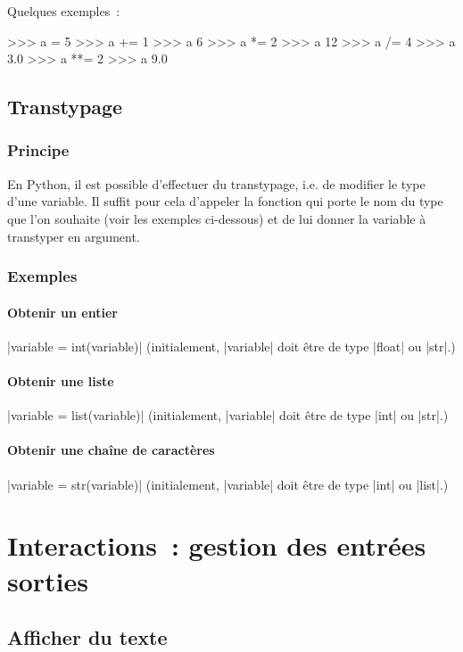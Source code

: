 		Quelques exemples~:
		
		\begin{pythoncode}
			>>> a = 5
			>>> a += 1
			>>> a
			6
			>>> a *= 2
			>>> a
			12
			>>> a /= 4
			>>> a
			3.0
			>>> a **= 2
			>>> a
			9.0
		\end{pythoncode}
	
	\subsection{Transtypage}
		
		\subsubsection{Principe}
		En Python, il est possible d'effectuer du transtypage, i.e. de modifier le type d'une variable. Il suffit pour cela d'appeler la fonction qui porte le nom du type que l'on souhaite (voir les exemples ci-dessous) et de lui donner la variable à transtyper en argument.
		
		\subsubsection{Exemples}
		\paragraph{Obtenir un entier} \python|variable = int(variable)| (initialement, \python|variable| doit être de type \python|float| ou \python|str|.)
		\paragraph{Obtenir une liste} \python|variable = list(variable)| (initialement, \python|variable| doit être de type \python|int| ou \python|str|.)
		\paragraph{Obtenir une chaîne de caractères} \python|variable = str(variable)| (initialement, \python|variable| doit être de type \python|int| ou \python|list|.)
		
	
\section{Interactions~: gestion des entrées sorties}
	
	\subsection{Afficher du texte}
		

